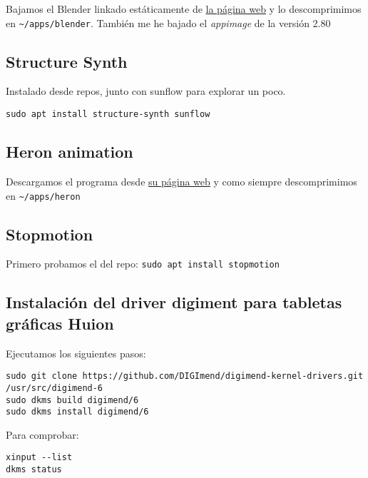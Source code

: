 \documentclass[
  12pt,
  spanish,
]{article}
\begin{document}
Bajamos el Blender linkado estáticamente de
\href{https://www.blender.org}{la página web} y lo descomprimimos en
\texttt{\textasciitilde{}/apps/blender}. También me he bajado el
\emph{appimage} de la versión 2.80

\hypertarget{structure-synth}{%
\subsection{Structure Synth}\label{structure-synth}}

Instalado desde repos, junto con sunflow para explorar un poco.

\begin{verbatim}
sudo apt install structure-synth sunflow
\end{verbatim}

\hypertarget{heron-animation}{%
\subsection{Heron animation}\label{heron-animation}}

Descargamos el programa desde
\href{https://heronanimation.brunolefevre.net/}{su página web} y como
siempre descomprimimos en \texttt{\textasciitilde{}/apps/heron}

\hypertarget{stopmotion}{%
\subsection{Stopmotion}\label{stopmotion}}

Primero probamos el del repo: \texttt{sudo\ apt\ install\ stopmotion}

\hypertarget{instalaciuxf3n-del-driver-digiment-para-tabletas-gruxe1ficas-huion}{%
\subsection{Instalación del driver digiment para tabletas gráficas
Huion}\label{instalaciuxf3n-del-driver-digiment-para-tabletas-gruxe1ficas-huion}}

Ejecutamos los siguientes pasos:

\begin{verbatim}
sudo git clone https://github.com/DIGImend/digimend-kernel-drivers.git /usr/src/digimend-6
sudo dkms build digimend/6
sudo dkms install digimend/6
\end{verbatim}

Para comprobar:

\begin{verbatim}
xinput --list
dkms status
\end{verbatim}
\end{document}
